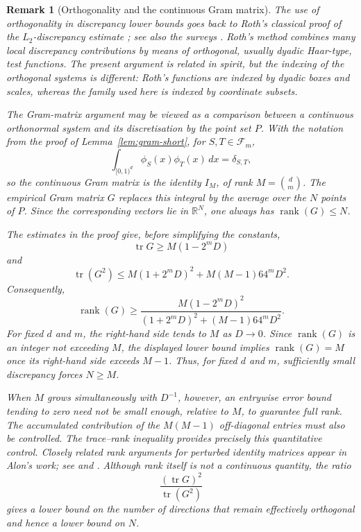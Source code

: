 \documentclass[10pt,a4paper]{amsart}
\newtheorem{remark}[theorem]{Remark}
\newcommand{\1}{\mathbf{1}}
\newcommand{\tr}{\operatorname{tr}}
\newcommand{\rank}{\operatorname{rank}}
\begin{document}
\begin{remark}[Orthogonality and the continuous Gram matrix]
\label{rem:continuous-gram}
The use of orthogonality in discrepancy lower bounds goes back to
Roth's classical proof of the \(L_2\)-discrepancy estimate
\cite{Roth54}; see also the surveys \cite{Bil11,Bil14}. Roth's method combines many local discrepancy contributions by means
of orthogonal, usually dyadic Haar-type, test functions.  The present
argument is related in spirit, but the indexing of the orthogonal
systems is different: Roth's functions are indexed by dyadic boxes
and scales, whereas the family used here is indexed by coordinate
subsets.

The Gram-matrix argument may be viewed as a comparison between a
continuous orthonormal system and its discretisation by the point set
\(P\). With the notation from the proof of Lemma~\ref{lem:gram-short}, for \(S,T\in\mathcal F_m\),
\[
 \int_{[0,1)^d}\phi_S(x)\phi_T(x)\,dx=\delta_{S,T},
\]
so the continuous Gram matrix is the identity \(I_M\), of rank
\(M=\binom dm\).  The empirical Gram matrix \(G\) replaces this
integral by the average over the \(N\) points of \(P\).  Since the
corresponding vectors lie in \(\mathbb R^N\), one always has
\(\rank(G)\le N\).

The estimates in the proof give, before simplifying the constants,
\[
 \tr G\ge M(1-2^mD)
\]
and
\[
 \tr(G^2)
 \le
 M(1+2^mD)^2+M(M-1)64^mD^2.
\]
Consequently,
\[
 \rank(G)
 \ge
 \frac{
 M(1-2^mD)^2
 }{
 (1+2^mD)^2+(M-1)64^mD^2
 }.
\]
For fixed \(d\) and \(m\), the right-hand side tends to \(M\) as
\(D\to0\).  Since \(\rank(G)\) is an integer not exceeding \(M\), the displayed
lower bound implies \(\rank(G)=M\) once its right-hand side exceeds
\(M-1\).  Thus, for fixed \(d\) and \(m\), sufficiently small
discrepancy forces \(N\ge M\).

When \(M\) grows simultaneously with \(D^{-1}\), however, an entrywise
error bound tending to zero need not be small enough, relative to \(M\),
to guarantee full rank.  The accumulated contribution of the
\(M(M-1)\) off-diagonal entries must also be controlled.  The
trace--rank inequality provides precisely this quantitative control.
Closely related rank arguments for perturbed identity matrices appear
in Alon's work; see \cite[Lemma~2.2, p.~4]{Alon09} and
\cite[Theorem~8.1 and the following discussion, p.~13]{Alon09}.
Although rank itself is not a continuous quantity, the ratio
\[
 \frac{(\tr G)^2}{\tr(G^2)}
\]
gives a lower bound on the number of directions that remain effectively
orthogonal and hence a lower bound on \(N\).
\end{remark}
\end{document}
